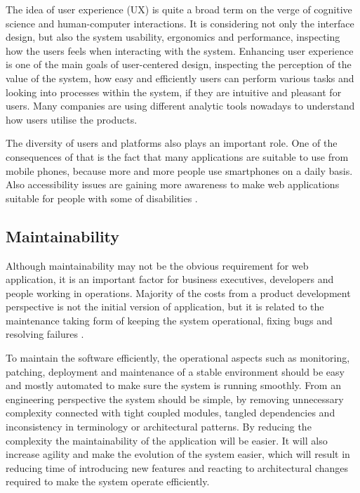 The idea of user experience (UX) is quite a broad term on the verge of cognitive science and human-computer interactions. It is considering not only the interface design, but also the system usability, ergonomics and performance, inspecting how the users feels when interacting with the system. Enhancing user experience is one of the main goals of user-centered design, inspecting the perception of the value of the system, how easy and efficiently users can perform various tasks and looking into processes within the system, if they are intuitive and pleasant for users. Many companies are using different analytic tools nowadays  to understand how users utilise the products.

The diversity of users and platforms also plays an important role. One of the consequences of that is the fact that many applications are suitable to use from mobile phones, because more and more people use smartphones on a daily basis. Also accessibility issues are gaining more awareness to make web applications suitable for people with some of disabilities \cite{WhatIsUserExperienceDesign}.

\subsection*{Maintainability}

Although maintainability may not be the obvious requirement for web application, it is an important factor for business executives, developers and people working in operations. Majority of the costs from a product development perspective is not the initial version of application, but it is related to the maintenance taking form of keeping the system operational, fixing bugs and resolving failures \cite{DesignDataIntensiveApplications}.

To maintain the software efficiently, the operational aspects such as monitoring, patching, deployment and maintenance of a stable environment should be easy and mostly automated to make sure the system is running smoothly. From an engineering perspective the system should be simple, by removing unnecessary complexity connected with tight coupled modules, tangled dependencies and inconsistency in terminology or architectural patterns. By reducing the complexity the maintainability of the application will be easier. It will also increase agility and make the evolution of the system easier, which will result in reducing time of introducing new features and reacting to architectural changes required to make the system operate efficiently.

